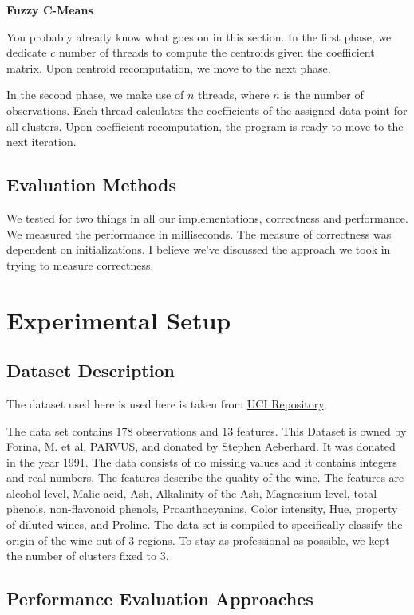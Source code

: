 \begin{multicols*}{2}
    \textbf{Fuzzy C-Means}

    You probably already know what goes on in this section.  In the first phase, we dedicate $c$ number of threads to compute the centroids given the coefficient matrix. Upon centroid recomputation, we move to the next phase. 

    In the second phase, we make use of $n$ threads, where $n$ is the number of observations. Each thread calculates the coefficients of the assigned data point for all clusters. Upon coefficient recomputation, the program is ready to move to the next iteration.

    \subsection{Evaluation Methods}

    We tested for two things in all our implementations, correctness and performance. We measured the performance in milliseconds. The measure of correctness was dependent on initializations. I believe we've discussed the approach we took in trying to measure correctness. 

    \section{Experimental Setup}

    \subsection{Dataset Description}
    The dataset used here is used here is taken from \href{https://archive.ics.uci.edu/ml/datasets/wine}{ UCI Repository},

    The data set contains 178 observations and 13 features.  This Dataset is owned by Forina, M. et al, PARVUS, and donated by Stephen Aeberhard. It was donated in the year 1991. The data consists of no missing values and it contains integers and real numbers. The features describe the quality of the wine. The features are alcohol level, Malic acid, Ash, Alkalinity of the Ash, Magnesium level, total phenols, non-flavonoid phenols, Proanthocyanins, Color intensity, Hue, property of diluted wines, and Proline. The data set is compiled to specifically classify the origin of the wine out of 3 regions. To stay as professional as possible, we kept the number of clusters fixed to 3.

    \subsection{Performance Evaluation Approaches}
    

\end{multicols*}
